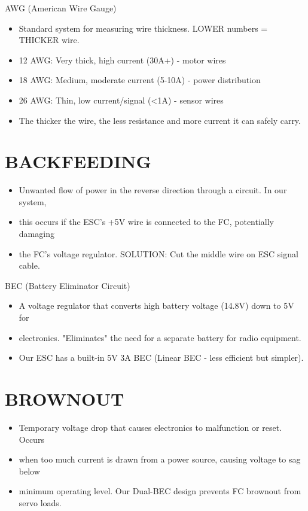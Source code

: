 \documentclass[11pt,letterpaper]{article}
\begin{document}
AWG (American Wire Gauge)\par

\begin{itemize}
  \item Standard system for measuring wire thickness. LOWER numbers = THICKER wire.
  \item 12 AWG: Very thick, high current (30A+) - motor wires
  \item 18 AWG: Medium, moderate current (5-10A) - power distribution
  \item 26 AWG: Thin, low current/signal (<1A) - sensor wires
  \item The thicker the wire, the less resistance and more current it can safely carry.
\end{itemize}

\section{BACKFEEDING}

\begin{itemize}
  \item Unwanted flow of power in the reverse direction through a circuit. In our system,
  \item this occurs if the ESC's +5V wire is connected to the FC, potentially damaging
  \item the FC's voltage regulator. SOLUTION: Cut the middle wire on ESC signal cable.
\end{itemize}

BEC (Battery Eliminator Circuit)\par

\begin{itemize}
  \item A voltage regulator that converts high battery voltage (14.8V) down to 5V for
  \item electronics. "Eliminates" the need for a separate battery for radio equipment.
  \item Our ESC has a built-in 5V 3A BEC (Linear BEC - less efficient but simpler).
\end{itemize}

\section{BROWNOUT}

\begin{itemize}
  \item Temporary voltage drop that causes electronics to malfunction or reset. Occurs
  \item when too much current is drawn from a power source, causing voltage to sag below
  \item minimum operating level. Our Dual-BEC design prevents FC brownout from servo loads.
\end{itemize}
\end{document}
